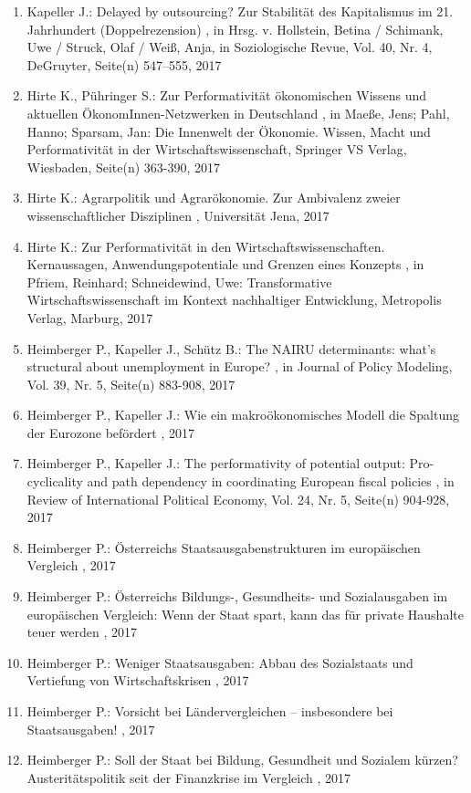 \begin{enumerate}[leftmargin=*, labelsep=0.5cm]
	 \item Kapeller J.:  Delayed by outsourcing? Zur Stabilität des Kapitalismus im 21. Jahrhundert (Doppelrezension)  , in Hrsg. v. Hollstein, Betina / Schimank, Uwe / Struck, Olaf / Weiß, Anja, in Soziologische Revue, Vol. 40, Nr. 4, DeGruyter, Seite(n) 547–555, 2017
	 \item Hirte K., Pühringer S.:  Zur Performativität ökonomischen Wissens und aktuellen ÖkonomInnen-Netzwerken in Deutschland  , in Maeße, Jens; Pahl, Hanno; Sparsam, Jan: Die Innenwelt der Ökonomie. Wissen, Macht und Performativität in der Wirtschaftswissenschaft, Springer VS Verlag, Wiesbaden, Seite(n) 363-390, 2017
	 \item Hirte K.:  Agrarpolitik und Agrarökonomie. Zur Ambivalenz zweier wissenschaftlicher Disziplinen  , Universität Jena, 2017
	 \item Hirte K.:  Zur Performativität in den Wirtschaftswissenschaften. Kernaussagen, Anwendungspotentiale und Grenzen eines Konzepts  , in Pfriem, Reinhard; Schneidewind, Uwe: Transformative Wirtschaftswissenschaft im Kontext nachhaltiger Entwicklung, Metropolis Verlag, Marburg, 2017
	 \item Heimberger P., Kapeller J., Schütz B.:  The NAIRU determinants: what’s structural about unemployment in Europe?  , in Journal of Policy Modeling, Vol. 39, Nr. 5, Seite(n) 883-908, 2017
	 \item Heimberger P., Kapeller J.:  Wie ein makroökonomisches Modell die Spaltung der Eurozone befördert  , 2017
	 \item Heimberger P., Kapeller J.:  The performativity of potential output: Pro-cyclicality and path dependency in coordinating European fiscal policies  , in Review of International Political Economy, Vol. 24, Nr. 5, Seite(n) 904-928, 2017
	 \item Heimberger P.:  Österreichs Staatsausgabenstrukturen im europäischen Vergleich  , 2017
	 \item Heimberger P.:  Österreichs Bildungs-, Gesundheits- und Sozialausgaben im europäischen Vergleich: Wenn der Staat spart, kann das für private Haushalte teuer werden  , 2017
	 \item Heimberger P.:  Weniger Staatsausgaben: Abbau des Sozialstaats und Vertiefung von Wirtschaftskrisen  , 2017
	 \item Heimberger P.:  Vorsicht bei Ländervergleichen – insbesondere bei Staatsausgaben!  , 2017
	 \item Heimberger P.:  Soll der Staat bei Bildung, Gesundheit und Sozialem kürzen? Austeritätspolitik seit der Finanzkrise im Vergleich  , 2017

\end{enumerate}
